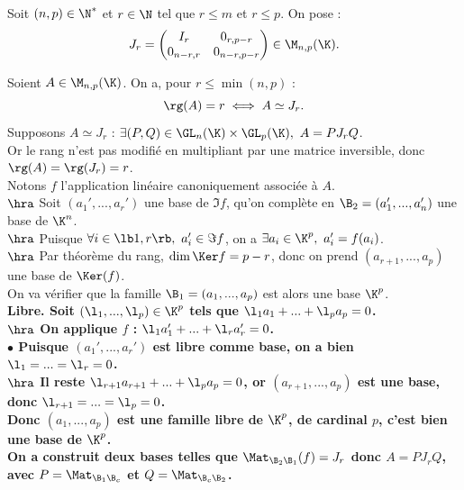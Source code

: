 \documentclass[11pt]{article}
\begin{document}
\begin{defi}{}{}
    Soit $(n,p)\in\N^*$ et $r\in\N$ tel que $r\leq m$ et $r\leq p$. On pose :
    \begin{equation*}
        J_r = \begin{pmatrix}
            I_r & 0_{r,p-r}\\
            0_{n-r,r} & 0_{n-r,p-r}
        \end{pmatrix} \in \M_{n,p}(\K).
    \end{equation*}
\end{defi}

\vspace*{-0.7cm}

\begin{thm}{}{}
    Soient $A\in \M_{n,p}(\K)$. On a, pour $r\leq\min(n,p)$ :
    \begin{equation*}
        \rg(A)=r\iff A\simeq J_r.
    \end{equation*}
    \tcblower
    \boxed{\la} Supposons $A\simeq J_r$ : $\exists (P,Q) \in \GL_n(\K)\times\GL_p(\K), ~ A = PJ_rQ$.\\
    Or le rang n'est pas modifié en multipliant par une matrice inversible, donc $\rg(A) = \rg(J_r) = r$.\\
    \boxed{\ra} Notons $f$ l'application linéaire canoniquement associée à $A$.\\
    $\hra$ Soit $(a_1',...,a_r')$ une base de $\Im f$, qu'on complète en $\B_2=(a_1',...,a_n')$ une base de $\K^n$.\\
    $\hra$ Puisque $\forall i \in \lb1,r\rb, ~ a_i' \in \Im f$, on a $\exists a_i \in \K^p , ~ a_i' = f(a_i)$.\\
    $\hra$ Par théorème du rang, $\dim\Ker f = p-r$, donc on prend $(a_{r+1},...,a_p)$ une base de $\Ker(f)$.\\
    On va vérifier que la famille $\B_1=(a_1,...,a_p)$ est alors une base $\K^p$.\\
    \bf{Libre.} Soit $(\l_1,...,\l_p)\in\K^p$ tels que $\l_1a_1+...+\l_pa_p=0$.\\
    $\hra$ On applique $f$ : $\l_1a_1' + ... + \l_ra_r' = 0$.\\
    $\bullet$ Puisque $(a_1',...,a_r')$ est libre comme base, on a bien $\l_1=...=\l_r=0$.\\
    $\hra$ Il reste $\l_{r+1}a_{r+1}+...+\l_pa_p = 0$, or $(a_{r+1},...,a_p)$ est une base, donc $\l_{r+1}=...=\l_p=0$.\\
    Donc $(a_1,...,a_p)$ est une famille libre de $\K^p$, de cardinal $p$, c'est bien une base de $\K^p$.\\
    On a construit deux bases telles que $\Mat_{\B_2\B_1}(f)=J_r$ donc $A=PJ_rQ$, avec $P=\Mat_{\B_1\B_c}$ et $Q=\Mat_{\B_c\B_2}$.
\end{thm}
\end{document}
